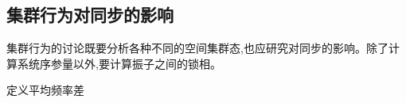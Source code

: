 \documentclass{article}
\begin{document}







\newpage
\subsection{集群行为对同步的影响}

集群行为的讨论既要分析各种不同的空间集群态,也应研究对同步的影响。除了计算系统序参量以外,要计算振子之间的锁相。

定义平均频率差
\end{document}
